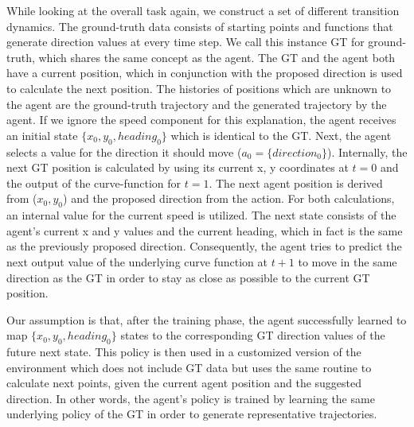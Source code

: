 While looking at the overall task again, we construct a set of different transition dynamics. The ground-truth data consists of starting points and functions that generate direction values at every time step. We call this instance GT for ground-truth, which shares the same concept as the agent. The GT and the agent both have a current position, which in conjunction with the proposed direction is used to calculate the next position. The histories of positions which are unknown to the agent are the ground-truth trajectory and the generated trajectory by the agent. If we ignore the speed component for this explanation, the agent receives an initial state $\{x_0,y_0,heading_0\}$ which is identical to the GT. Next, the agent selects a value for the direction it should move ($a_0=\{direction_0\}$). Internally, the next GT position is calculated by using its current x, y coordinates at $t=0$ and the output of the curve-function for $t=1$. The next agent position is derived from ($x_0, y_0$) and the proposed direction from the action. For both calculations, an internal value for the current speed is utilized. The next state consists of the agent's current x and y values and the current heading, which in fact is the same as the previously proposed direction. Consequently, the agent tries to predict the next output value of the underlying curve function at $t+1$ to move in the same direction as the GT in order to stay as close as possible to the current GT position.
\par
Our assumption is that, after the training phase, the agent successfully learned to map $\{x_0,y_0,heading_0\}$ states to the corresponding GT direction values of the future next state. This policy is then used in a customized version of the environment which does not include GT data but uses the same routine to calculate next points, given the current agent position and the suggested direction. In other words, the agent's policy is trained by learning the same underlying policy of the GT in order to generate representative trajectories.
\par
